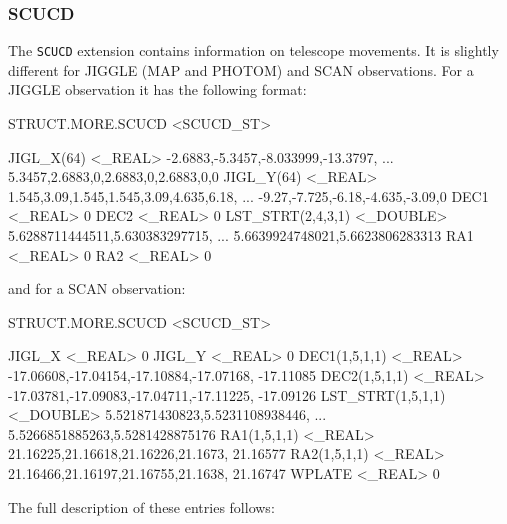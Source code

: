 \documentclass[twoside,11pt,nolof]{starlink}
\begin{document}
\subsubsection{SCUCD}

The \texttt{SCUCD} extension contains information on telescope movements.
It is slightly different for JIGGLE (MAP and PHOTOM) and SCAN observations.
For a JIGGLE observation it has the following format:

\begin{small}
\begin{terminalv}
STRUCT.MORE.SCUCD  <SCUCD_ST>

   JIGL_X(64)     <_REAL>         -2.6883,-5.3457,-8.033999,-13.3797,
                                  ... 5.3457,2.6883,0,2.6883,0,2.6883,0,0
   JIGL_Y(64)     <_REAL>         1.545,3.09,1.545,1.545,3.09,4.635,6.18,
                                  ... -9.27,-7.725,-6.18,-4.635,-3.09,0
   DEC1           <_REAL>         0
   DEC2           <_REAL>         0
   LST_STRT(2,4,3,1)  <_DOUBLE>   5.6288711444511,5.630383297715,
                                  ... 5.6639924748021,5.6623806283313
   RA1            <_REAL>         0
   RA2            <_REAL>         0
\end{terminalv}
\end{small}

and for a SCAN observation:

\begin{small}
\begin{terminalv}
STRUCT.MORE.SCUCD  <SCUCD_ST>

   JIGL_X         <_REAL>         0
   JIGL_Y         <_REAL>         0
   DEC1(1,5,1,1)  <_REAL>         -17.06608,-17.04154,-17.10884,-17.07168,
                                  -17.11085
   DEC2(1,5,1,1)  <_REAL>         -17.03781,-17.09083,-17.04711,-17.11225,
                                  -17.09126
   LST_STRT(1,5,1,1)  <_DOUBLE>   5.521871430823,5.5231108938446,
                                  ... 5.5266851885263,5.5281428875176
   RA1(1,5,1,1)   <_REAL>         21.16225,21.16618,21.16226,21.1673,
                                  21.16577
   RA2(1,5,1,1)   <_REAL>         21.16466,21.16197,21.16755,21.1638,
                                  21.16747
   WPLATE         <_REAL>         0
\end{terminalv}
\end{small}

The full description of these entries follows:
\end{document}
